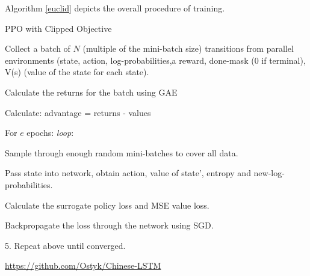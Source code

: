\documentclass[12pt,a4paper]{article}
\begin{document}
Algorithm \ref{euclid} depicts the overall procedure of training.
\begin{algorithm}
\caption{PPO with Clipped Objective }\label{euclid}
\begin{algorithmic}[1]
\item Collect a batch of $N$ (multiple of the mini-batch size) transitions from parallel environments \newline (state, action, log-probabilities,a reward, done-mask (0 if terminal), V(s) (value of the state for each state).
\item Calculate the returns for the batch using GAE
\item Calculate: advantage = returns - values
\item For $e$ epochs: \emph{loop}:
\begin{algorithmic}[1]
\item Sample through enough random mini-batches to cover all data.
\item Pass state into network, obtain action, value of state', entropy and new-log-probabilities.
\item Calculate the surrogate policy loss and MSE value loss.
\item Backpropagate the loss through the network using SGD.
\end{algorithmic}
\item 5. Repeat above until converged.
\end{algorithmic}
\end{algorithm}





\begin{thebibliography}{1}

 \url{https://github.com/Ostyk/Chinese-LSTM}




\end{thebibliography}
\end{document}
